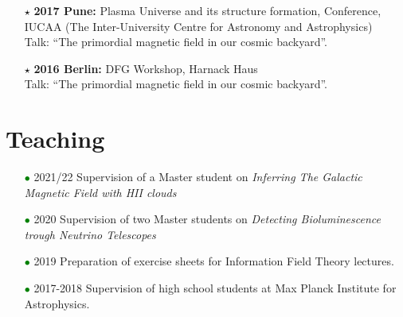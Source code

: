 \documentclass[11pt,a4paper,sans, table, dvipsnames]{moderncv}        %
\begin{document}
\begin{itemize}
\begin{itemize}
    \item[\textcolor{Black}{$\star$}]{\textbf{2017 Pune:} Plasma Universe and its structure formation, Conference, IUCAA (The Inter-University Centre for Astronomy and Astrophysics)\\ Talk: ``The primordial magnetic field in our cosmic backyard''.}

    \item[\textcolor{Black}{$\star$}]{\textbf{2016 Berlin:} DFG Workshop, Harnack Haus\\ Talk: ``The primordial magnetic field in our cosmic backyard''.}
  \end{itemize}

\end{itemize}

\vspace{\baselineskip}
\section{Teaching}
\begin{itemize}
\item[\textcolor{Green}{$\bullet$}] 2021/22 Supervision of a Master student
on  \textit{Inferring The Galactic Magnetic Field with HII clouds}
\vspace{5pt}

\item[\textcolor{Green}{$\bullet$}] 2020 Supervision of two Master students on
\textit{Detecting Bioluminescence trough Neutrino Telescopes}

\vspace{5pt}

\item[\textcolor{Green}{$\bullet$}] 2019 Preparation of exercise sheets for Information Field Theory lectures.

\vspace{5pt}

\item[\textcolor{Green}{$\bullet$}] 2017-2018 Supervision of high school students at Max Planck Institute for Astrophysics.
\end{itemize}

\end{document}
